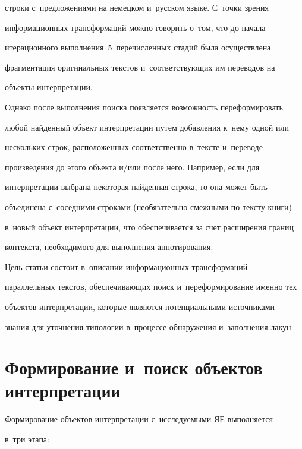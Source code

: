 строки с~предложениями на немецком и~русском языке. С~точки зрения 


информационных трансформаций можно говорить о~том, что до начала 


итерационного выполнения~5~перечисленных стадий была осуществлена 


фрагментация оригинальных текстов и~соответствующих им переводов на 


объекты интерпретации.


  


  Однако после выполнения поиска появляется возможность переформировать 


любой найденный объект интерпретации путем добавления к~нему одной или 


нескольких строк, расположенных соответственно в~тексте и~переводе 


произведения до этого объекта и\!/\!или после него. Например, если для 


интерпретации выбрана некоторая найденная строка, то она может быть 


объединена с~соседними строками (необязательно смежными по тексту книги) 


в~новый объект интерпретации, что обеспечивается за счет расширения границ 


контекста, необходимого для выполнения аннотирования.


  


  Цель статьи состоит в~описании информационных трансформаций 


параллельных текстов, обеспечивающих поиск и~переформирование именно тех 


объектов интерпретации, которые являются потенциальными источниками 


знания для уточнения типологии в~процессе обнаружения и~заполнения лакун.


  


\section{Формирование и~поиск объектов интерпретации}





  Формирование объектов интерпретации с~исследуемыми ЯЕ выполняется 


в~три этапа:


